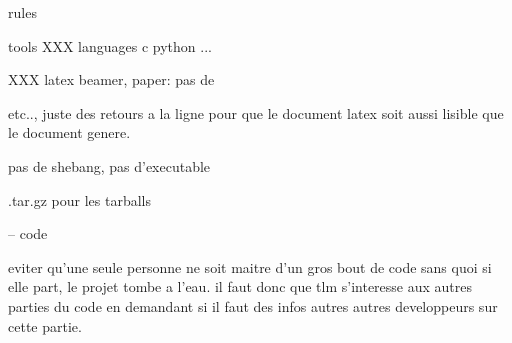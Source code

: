 rules

  tools
    XXX
  languages
    c
    python
    ...

XXX latex
beamer, %
paper: pas de \par etc.., juste des retours a la ligne pour que le document
latex soit aussi lisible que le document genere.

pas de shebang, pas d'executable

.tar.gz pour les tarballs

-- code

eviter qu'une seule personne ne soit maitre d'un gros bout de code sans
quoi si elle part, le projet tombe a l'eau. il faut donc que tlm s'interesse
aux autres parties du code en demandant si il faut des infos autres autres
developpeurs sur cette partie.
